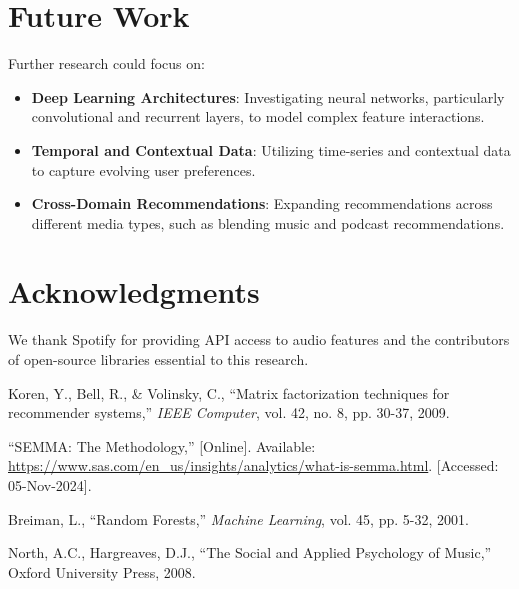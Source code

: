\documentclass[12pt]{article}
\begin{document}
\section{Future Work}
Further research could focus on:
\begin{itemize}
    \item \textbf{Deep Learning Architectures}: Investigating neural networks, particularly convolutional and recurrent layers, to model complex feature interactions.
    \item \textbf{Temporal and Contextual Data}: Utilizing time-series and contextual data to capture evolving user preferences.
    \item \textbf{Cross-Domain Recommendations}: Expanding recommendations across different media types, such as blending music and podcast recommendations.
\end{itemize}

\section{Acknowledgments}
We thank Spotify for providing API access to audio features and the contributors of open-source libraries essential to this research.

\begin{thebibliography}{9}
Koren, Y., Bell, R., \& Volinsky, C., ``Matrix factorization techniques for recommender systems,'' \textit{IEEE Computer}, vol. 42, no. 8, pp. 30-37, 2009.

``SEMMA: The Methodology,'' [Online]. Available: \url{https://www.sas.com/en_us/insights/analytics/what-is-semma.html}. [Accessed: 05-Nov-2024].

Breiman, L., ``Random Forests,'' \textit{Machine Learning}, vol. 45, pp. 5-32, 2001.

North, A.C., Hargreaves, D.J., ``The Social and Applied Psychology of Music,'' Oxford University Press, 2008.

\end{thebibliography}
\end{document}
